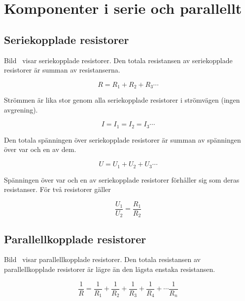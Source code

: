 \newpage
\section[Serie och parallellt]{Komponenter i serie och parallellt}

\subsection{Seriekopplade resistorer}
\label{seriekopplade_resistorer}


Bild~ visar seriekopplade resistorer.
Den totala resistansen av seriekopplade resistorer är summan av resistanserna.

\[R = R_1 + R_2 + R_3 \cdots \]

Strömmen är lika stor genom alla seriekopplade resistorer i strömvägen (ingen
avgrening).

\[I = I_1 = I_2 = I_3 \cdots \]

Den totala spänningen över seriekopplade resistorer är summan av spänningen över
var och en av dem.

\[U = U_1 + U_2 + U_3 \cdots \]

Spänningen över var och en av seriekopplade resistorer förhåller sig som deras
resistanser. För två resistorer gäller

\[\dfrac{U_1}{U_2} = \dfrac{R_1}{R_2}\]


\subsection{Parallellkopplade resistorer}
\label{parallellkopplade_resistorer}


Bild~ visar parallellkopplade resistorer.
Den totala resistansen av parallellkopplade resistorer är lägre än den lägsta
enstaka resistansen.

\[
\frac{1}{R} = \frac{1}{R_1} + \frac{1}{R_2} +
\frac{1}{R_3} + \frac{1}{R_4} + \cdots \frac{1}{R_n}
\]

